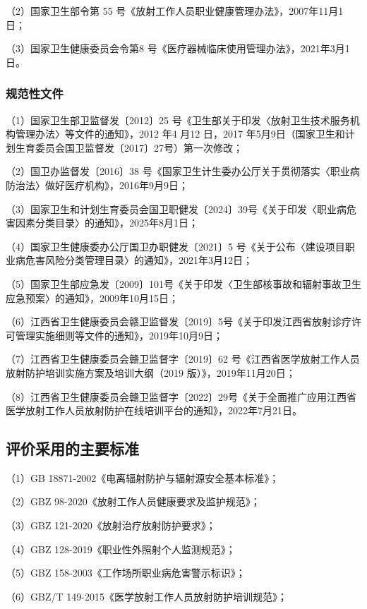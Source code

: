 （2）国家卫生部令第 55 号《放射工作人员职业健康管理办法》，2007年11月1日；

（3）国家卫生健康委员会令第8 号《医疗器械临床使用管理办法》，2021年3月1日。

\subsubsection{规范性文件}

（1）国家卫生部卫监督发〔2012〕25 号《卫生部关于印发〈放射卫生技术服务机构管理办法〉等文件的通知》，2012 年4 月12 日，2017 年5月9日（国家卫生和计划生育委员会国卫监督发〔2017〕27号）第一次修改；

（2）国卫办监督发〔2016〕38 号《国家卫生计生委办公厅关于贯彻落实〈职业病防治法〉做好医疗机构》，2016年9月9日；

（3）国家卫生和计划生育委员会国卫职健发〔2024〕39号《关于印发〈职业病危害因素分类目录〉的通知》，2025年8月1日；

（4）国家卫生健康委办公厅国卫办职健发〔2021〕5 号《关于公布〈建设项目职业病危害风险分类管理目录〉的通知》，2021年3月12日；

（5）国家卫生部应急发〔2009〕101号《关于印发〈卫生部核事故和辐射事故卫生应急预案〉的通知》，2009年10月15日；

（6）江西省卫生健康委员会赣卫监督发〔2019〕5号《关于印发江西省放射诊疗许可管理实施细则等文件的通知》，2019年10月9日；

（7）江西省卫生健康委员会赣卫监督字〔2019〕62 号《江西省医学放射工作人员放射防护培训实施方案及培训大纲（2019 版）》，2019年11月20日；

（8）江西省卫生健康委员会赣卫监督字〔2022〕29号《关于全面推广应用江西省医学放射工作人员放射防护在线培训平台的通知》，2022年7月21日。

\subsection{评价采用的主要标准}

（1）GB 18871-2002《电离辐射防护与辐射源安全基本标准》；

（2）GBZ 98-2020《放射工作人员健康要求及监护规范》；

（3）GBZ 121-2020《放射治疗放射防护要求》；

（4）GBZ 128-2019《职业性外照射个人监测规范》；

（5）GBZ 158-2003《工作场所职业病危害警示标识》；

（6）GBZ/T 149-2015《医学放射工作人员放射防护培训规范》；

